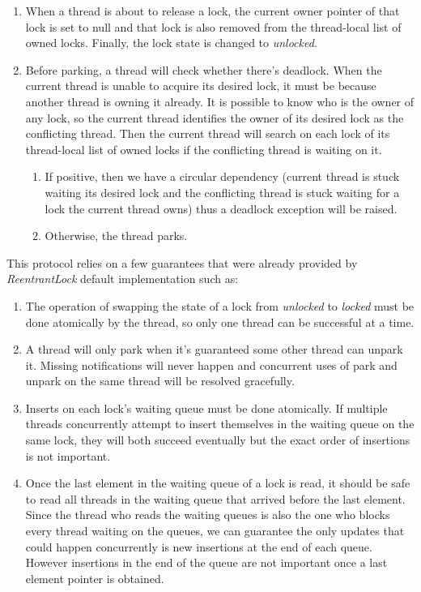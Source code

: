 \begin{enumerate}
\item When a thread is about to release a lock, the current owner pointer of that lock is set to null and that lock is also removed from the thread-local list of owned locks. Finally, the lock state is changed to \emph{unlocked}.
\item Before parking, a thread will check whether there's deadlock. When the current thread is unable to acquire its desired lock, it must be because another thread is owning it already. It is possible to know who is the owner of any lock, so the current thread identifies the owner of its desired lock as the conflicting thread. Then the current thread will search on each lock of its thread-local list of owned locks if the conflicting thread is waiting on it.
\begin{enumerate}
\item If positive, then we have a circular dependency (current thread is stuck waiting its desired lock and the conflicting thread is stuck waiting for a lock the current thread owns) thus a deadlock exception will be raised.
\item Otherwise, the thread parks.
\end{enumerate}
\end{enumerate}

This protocol relies on a few guarantees that were already provided by \emph{ReentrantLock} default implementation such as:
\begin{enumerate}
\item The operation of swapping the state of a lock from \emph{unlocked} to \emph{locked} must be done atomically by the thread, so only one thread can be successful at a time.
\item A thread will only park when it's guaranteed some other thread can unpark it. Missing notifications will never happen and concurrent uses of park and unpark on the same thread will be resolved gracefully.
\item Inserts on each lock's waiting queue must be done atomically. If multiple threads concurrently attempt to insert themselves in the waiting queue on the same lock, they will both succeed eventually but the exact order of insertions is not important.
\item Once the last element in the waiting queue of a lock is read, it should be safe to read all threads in the waiting queue that arrived before the last element. Since the thread who reads the waiting queues is also the one who blocks every thread waiting on the queues, we can guarantee the only updates that could happen concurrently is new insertions at the end of each queue. However insertions in the end of the queue are not important once a last element pointer is obtained.
\end{enumerate}


